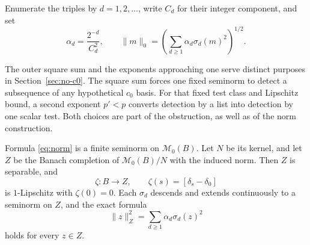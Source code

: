 Enumerate the triples by \(d=1,2,\ldots\), write \(C_d\) for their
integer component, and set
\begin{equation}
             \alpha_d=\frac{2^{-d}}{C_d^2},\qquad
 \|m\|_0=\left(\sum_{d\geq1}\alpha_d\sigma_d(m)^2\right)^{1/2}.
                                                               \label{eq:norm}
\end{equation}

The outer square sum and the exponents approaching one serve distinct
purposes in Section~\ref{sec:no-c0}. The square sum forces one fixed
seminorm to detect a subsequence of any hypothetical \(c_0\) basis.
For that fixed test class and Lipschitz bound, a second exponent
\(p'<p\) converts detection by a list into detection by one scalar
test. Both choices are part
of the obstruction, as well as of the norm construction.

\begin{lemma}\label{lem:completion}
Formula \eqref{eq:norm} is a finite seminorm on \(\mathcal M_0(B)\).
Let \(N\) be its kernel, and let \(Z\) be the Banach completion of
\(\mathcal M_0(B)/N\) with the induced norm. Then \(Z\) is separable,
and
\begin{equation}
 \zeta:B\to Z,\qquad \zeta(s)=[\delta_s-\delta_0]             \label{eq:zeta}
\end{equation}
is \(1\)-Lipschitz with \(\zeta(0)=0\). Each \(\sigma_d\) descends
and extends continuously to a seminorm on \(Z\), and the exact formula
\begin{equation}
                    \|z\|_Z^2=\sum_{d\geq1}
                                \alpha_d\sigma_d(z)^2         \label{eq:completed-norm}
\end{equation}
holds for every \(z\in Z\).
\end{lemma}

